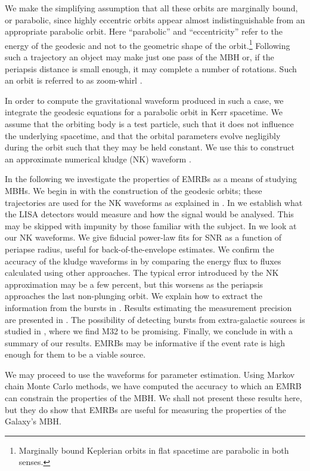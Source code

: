 We make the simplifying assumption that all these orbits are marginally bound, or parabolic, since highly eccentric orbits appear almost indistinguishable from an appropriate parabolic orbit. Here ``parabolic'' and ``eccentricity'' refer to the energy of the geodesic and not to the geometric shape of the orbit.\footnote{Marginally bound Keplerian orbits in flat spacetime are parabolic in both senses.} Following such a trajectory an object may make just one pass of the MBH or, if the periapsis distance is small enough, it may complete a number of rotations. Such an orbit is referred to as zoom-whirl \citep{Glampedakis2002a}.

In order to compute the gravitational waveform produced in such a case, we integrate the geodesic equations for a parabolic orbit in Kerr spacetime. We assume that the orbiting body is a test particle, such that it does not influence the underlying spacetime, and that the orbital parameters evolve negligibly during the orbit such that they may be held constant. We use this to construct an approximate numerical kludge (NK) waveform \citep{Babak2007}.

In the following we investigate the properties of EMRBs as a means of studying MBHs. We begin in  with the construction of the geodesic orbits; these trajectories are used for the NK waveforms as explained in . In  we establish what the LISA detectors would measure and how the signal would be analysed. This may be skipped with impunity by those familiar with the subject. In  we look at our NK waveforms. We give fiducial power-law fits for SNR as a function of periapse radius, useful for back-of-the-envelope estimates. We confirm the accuracy of the kludge waveforms in  by comparing the energy flux to fluxes calculated using other approaches. The typical error introduced by the NK approximation may be a few percent, but this worsens as the periapsis approaches the last non-plunging orbit. We explain how to extract the information from the bursts in . Results estimating the measurement precision are presented in . The possibility of detecting bursts from extra-galactic sources is studied in , where we find M32 to be promising. Finally, we conclude in  with a summary of our results. EMRBs may be informative if the event rate is high enough for them to be a viable source.

We may proceed to use the waveforms for parameter estimation. Using Markov chain Monte Carlo methods, we have computed the accuracy to which an EMRB can constrain the properties of the MBH. We shall not present these results here, but they do show that EMRBs are useful for measuring the properties of the Galaxy's MBH.

